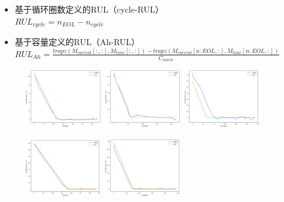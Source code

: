 \documentclass{beamer}
\begin{document}
\begin{frame}
	\begin{itemize}
		\item 基于循环圈数定义的RUL（cycle-RUL）\\${RUL_{cycle} = n_{EOL} - n_{cycle}}$
		\item 基于容量定义的RUL（Ah-RUL）\\${RUL_{Ah} = \frac{trapz(M_{current}[:, :], M_{time}[:, :]) - trapz(M_{current}[n:EOL, :], M_{time}[n:EOL, :])}{C_{norm}}}$
	\end{itemize}
	\begin{figure}[htbp]
		\centering
			{\label{fig:subfig1}\includegraphics[width=0.3\textwidth]{figures/rul/unibo_lstm_rul_cycle_1.jpg}}
			{\label{fig:subfig2}\includegraphics[width=0.3\textwidth]{figures/rul/unibo_lstm_rul_cycle_2.jpg}}
			{\label{fig:subfig2}\includegraphics[width=0.3\textwidth]{figures/rul/unibo_lstm_rul_cycle_3.jpg}}
	\end{figure}
	\begin{figure}[htbp]
		\centering
			{\label{fig:subfig1}\includegraphics[width=0.3\textwidth]{figures/rul/unibo_lstm_rul_cycle_4.jpg}}
			{\label{fig:subfig2}\includegraphics[width=0.3\textwidth]{figures/rul/unibo_lstm_rul_cycle_5.jpg}}

\end{figure}
\end{frame}
\end{document}
